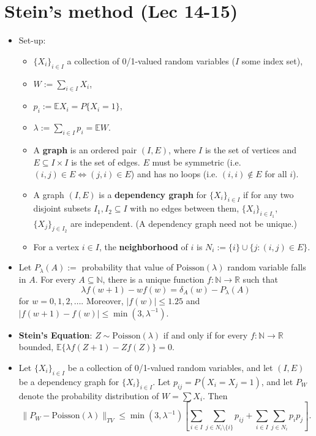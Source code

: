 \documentclass[twoside]{article}
\newcommand\bbE{\mathbb{E}}
\newcommand\bbN{\mathbb{N}}
\newcommand\bbR{\mathbb{R}}
\newcommand\dlt{\delta}
\newcommand\lmb{\lambda}
\begin{document}
\section*{Stein's method (Lec 14-15)}
\begin{itemize}
\item Set-up:
\begin{itemize}
\item $\{ X_i \}_{i \in I}$ a collection of 0/1-valued random variables ($I$ some index set),
\item $W := \displaystyle\sum_{i \in I} X_i$,
\item $p_i := \bbE X_i = P\{X_i = 1 \}$,
\item $\lmb := \sum_{i \in I} p_i = \bbE W$.
\item A \textbf{graph} is an ordered pair $(I, E)$, where $I$ is the set of vertices and $E \subseteq I \times I$ is the set of edges. $E$ must be symmetric (i.e. $(i, j) \in E \Leftrightarrow (j, i) \in E$) and has no loops (i.e. $(i, i) \notin E$ for all $i$).

\item A graph $(I, E)$ is a \textbf{dependency graph} for $\{ X_i \}_{i \in I}$ if for any two disjoint subsets $I_1, I_2 \subseteq I$ with no edges between them, $\{ X_i \}_{i \in I_1}$, $\{ X_j \}_{j \in I_2}$ are independent. (A dependency graph need not be unique.)

\item For a vertex $i \in I$, the \textbf{neighborhood} of $i$ is $N_i := \{ i \} \cup \{j : (i, j) \in E \}$.
\end{itemize}

\item Let $P_\lmb(A) :=$ probability that value of $\text{Poisson}(\lmb)$ random variable falls in $A$. For every $A \subseteq \bbN$, there is a unique function $f: \bbN \rightarrow \bbR$ such that 
\begin{equation*} \lmb f(w + 1) - wf(w) = \dlt_A(w) - P_\lmb(A) \end{equation*}
for $w = 0, 1, 2, \dots$. Moreover, $|f(w)| \leq 1.25$ and $|f(w+1) - f(w)| \leq \min(3, \lmb^{-1})$.

\item \textbf{Stein's Equation}: $Z \sim \text{Poisson}(\lmb)$ if and only if for every $f : \bbN \rightarrow \bbR$ bounded, $\bbE \{ \lmb f(Z + 1) - Zf(Z) \} = 0$.

\item Let $\{ X_i \}_{i \in I}$ be a collection of 0/1-valued random variables, and let $(I, E)$ be a dependency graph for $\{ X_i \}_{i \in I}$. Let $p_{ij} = P(X_i = X_j = 1)$, and let $P_W$ denote the probability distribution of $W = \sum X_i$. Then
\begin{equation*} \lVert P_W - \text{Poisson}(\lmb) \rVert_{TV} \leq \min (3, \lmb^{-1}) \left[ \sum_{i \in I} \sum_{j \in N_i \setminus \{ i\}} p_{ij} + \sum_{i \in I} \sum_{j \in N_i} p_i p_j \right]. \end{equation*}
\end{itemize}
\end{document}
